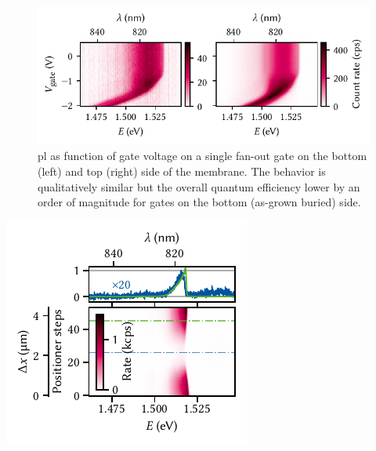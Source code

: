 \begin{figure}
    \centering
    \includegraphics{img/pdf/experiment/honey_H13_stark_shift_vs_gate}
    \caption[
        ,
        .
        \protect\newline
    ]{
        \Gls{pl} as function of gate voltage on a single fan-out gate on the bottom (left) and top (right) side of the membrane.
        The behavior is qualitatively similar but the overall quantum efficiency lower by an order of magnitude for gates on the bottom (as-grown buried) side.
    }
    \label{fig:exp:pl:honey_H13_stark_shift_vs_gate}
\end{figure}

\begin{marginfigure}
    \centering
    \includegraphics{img/pdf/experiment/fig_F10_positioning}
    \caption[
        .
        \protect\newline
    ]{}
    \label{fig:exp:pl:fig_F10_positioning}
\end{marginfigure}

